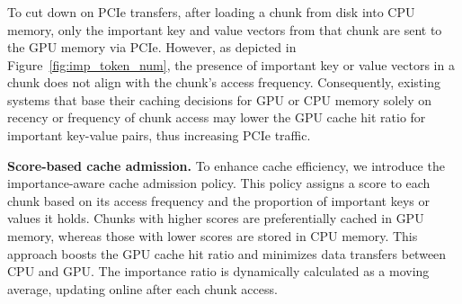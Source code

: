 %


\subsubsection{\techBb{}}
\label{sec:techbb}
To cut down on PCIe transfers, after loading a chunk from disk into CPU
memory, only the important key and value vectors from that chunk are sent to the
GPU memory via PCIe. However, as depicted in Figure~\ref{fig:imp_token_num}, the
presence of important key or value vectors in a chunk does not align with the
chunk's access frequency. Consequently, existing systems that base their caching
decisions for GPU or CPU memory solely on recency or frequency of chunk access
may lower the GPU cache hit ratio for important key-value pairs, thus increasing
PCIe traffic.

\noindent \textbf{Score-based cache admission.}
To enhance cache efficiency, we introduce the importance-aware cache admission policy.
This policy assigns a score to each chunk based on its access frequency and the
proportion of important keys or values it holds. Chunks with higher scores are
preferentially cached in GPU memory, whereas those with lower scores are stored
in CPU memory. This approach boosts the GPU cache hit ratio and minimizes data
transfers between CPU and GPU. The importance ratio is dynamically calculated as
a moving average, updating online after each chunk access.




